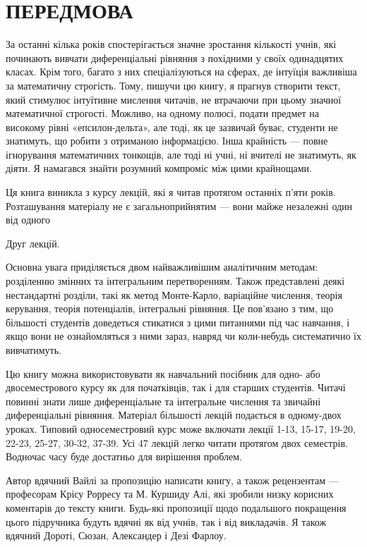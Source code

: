 \documentclass[
]{article}
\begin{document}
\section{ПЕРЕДМОВА}\label{ux43fux435ux440ux435ux434ux43cux43eux432ux430}

За останні кілька років спостерігається значне зростання кількості
учнів, які починають вивчати диференціальні рівняння з похідними у своїх
одинадцятих класах. Крім того, багато з них спеціалізуються на сферах,
де інтуїція важливіша за математичну строгість. Тому, пишучи цю книгу, я
прагнув створити текст, який стимулює інтуїтивне мислення читачів, не
втрачаючи при цьому значної математичної строгості. Можливо, на одному
полюсі, подати предмет на високому рівні «епсилон-дельта», але тоді, як
це зазвичай буває, студенти не знатимуть, що робити з отриманою
інформацією. Інша крайність --- повне ігнорування математичних тонкощів,
але тоді ні учні, ні вчителі не знатимуть, як діяти. Я намагався знайти
розумний компроміс між цими крайнощами.

Ця книга виникла з курсу лекцій, які я читав протягом останніх п'яти
років. Розташування матеріалу не є загальноприйнятим --- вони майже
незалежні один від одного

Друг лекцій.

Основна увага приділяється двом найважливішим аналітичним методам:
розділенню змінних та інтегральним перетворенням. Також представлені
деякі нестандартні розділи, такі як метод Монте-Карло, варіаційне
числення, теорія керування, теорія потенціалів, інтегральні рівняння. Це
пов'язано з тим, що більшості студентів доведеться стикатися з цими
питаннями під час навчання, і якщо вони не ознайомляться з ними зараз,
навряд чи коли-небудь систематично їх вивчатимуть.

Цю книгу можна використовувати як навчальний посібник для одно- або
двосеместрового курсу як для початківців, так і для старших студентів.
Читачі повинні знати лише диференціальне та інтегральне числення та
звичайні диференціальні рівняння. Матеріал більшості лекцій подається в
одному-двох уроках. Типовий односеместровий курс може включати лекції
1-13, 15-17, 19-20, 22-23, 25-27, 30-32, 37-39. Усі 47 лекцій легко
читати протягом двох семестрів. Водночас часу буде достатньо для
вирішення проблем.

Автор вдячний Вайлі за пропозицію написати книгу, а також рецензентам
--- професорам Крісу Рорресу та М. Куршиду Алі, які зробили низку
корисних коментарів до тексту книги. Будь-які пропозиції щодо подальшого
покращення цього підручника будуть вдячні як від учнів, так і від
викладачів. Я також вдячний Дороті, Сюзан, Александер і Дезі Фарлоу.
\end{document}
